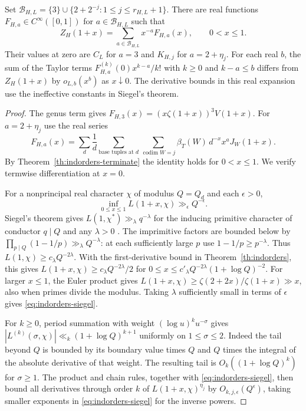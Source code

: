 \begin{theorem}\label{th:indorders-smooth}
Set $\mathcal B_{H,L}=\{3\}\cup\{2+2^{-j}:1\le j\le r_{H,L}+1\}$. There are real functions $F_{H,a}\in C^\infty([0,1])$ for $a\in\mathcal B_{H,L}$ such that
\[
 Z_H(1+x)=\sum_{a\in\mathcal B_{H,L}} x^{-a} F_{H,a}(x),\qquad 0<x\le1.
\]
Their values at zero are $C_L$ for $a=3$ and $K_{H,j}$ for $a=2+\eta_j$. For each real $b$, the sum of the Taylor terms
$F_{H,a}^{(k)}(0)x^{k-a}/k!$ with $k\ge0$ and $k-a\le b$ differs from $Z_H(1+x)$ by $o_{L,b}(x^b)$ as $x\downarrow0$. The derivative bounds in this real expansion use the ineffective constants in Siegel's theorem.
\end{theorem}
\begin{proof}
The genus term gives $F_{H,3}(x)=(x\zeta(1+x))^3V(1+x)$. For $a=2+\eta_j$ use the real series
\[
 F_{H,a}(x)=\sum_d \frac1d\sum_{\text{base tuples at }d}
  \sum_{\operatorname{codim}W=j}\beta_T(W)\,d^{-x}
             x^{a}J_W(1+x).
\]
By Theorem~\ref{th:indorders-terminate} the identity holds for
$0<x\le1$. We verify termwise differentiation at $x=0$.

For a nonprincipal real character $\chi$ of modulus $Q=Q_d$ and each $\epsilon>0$,
\begin{equation}\label{eq:indorders-siegel}
 \inf_{0\le x\le1} L(1+x,\chi)\gg_\epsilon Q^{-\epsilon}.
\end{equation}
Siegel's theorem gives $L(1,\chi^*)\gg_\lambda q^{-\lambda}$ for the inducing primitive character of conductor $q\mid Q$ and any $\lambda>0$ \cite[Chap.~21]{Davenport}. The imprimitive factors are bounded below by $\prod_{p\mid Q}(1-1/p)\gg_\lambda Q^{-\lambda}$: at each sufficiently large $p$ use $1-1/p\ge p^{-\lambda}$. Thus $L(1,\chi)\ge c_\lambda Q^{-2\lambda}$. With the first-derivative bound in Theorem~\ref{th:indorders}, this gives $L(1+x,\chi)\ge c_\lambda Q^{-2\lambda}/2$ for $0\le x\le c'_\lambda Q^{-2\lambda}(1+\log Q)^{-2}$. For larger $x\le1$, the Euler product gives $L(1+x,\chi)\ge\zeta(2+2x)/\zeta(1+x)\gg x$, also when primes divide the modulus. Taking $\lambda$ sufficiently small in terms of $\epsilon$ gives \eqref{eq:indorders-siegel}.

For $k\ge0$, period summation with weight $(\log u)^k u^{-\sigma}$ gives
$|L^{(k)}(\sigma,\chi)|\ll_k(1+\log Q)^{k+1}$ uniformly on $1\le\sigma\le2$. Indeed the tail beyond $Q$ is bounded by its boundary value times $Q$ and $Q$ times the integral of the absolute derivative of that weight. The resulting tail is $O_k((1+\log Q)^k)$ for $\sigma\ge1$.
The product and chain rules, together with
\eqref{eq:indorders-siegel}, then bound all derivatives through
order $k$ of $L(1+x,\chi)^{\eta_j}$ by
$O_{k,j,\epsilon}(Q^\epsilon)$, taking smaller exponents in
\eqref{eq:indorders-siegel} for the inverse powers.


\end{proof}
